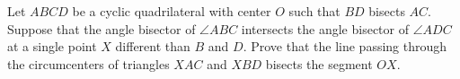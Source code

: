 Let $ABCD$ be a cyclic quadrilateral with center $O$ such that $BD$ bisects $AC.$ Suppose that the angle bisector of $\angle ABC$ intersects the angle bisector of $\angle ADC$ at a single point $X$ different than $B$ and $D.$ Prove that the line passing through the circumcenters of triangles $XAC$ and $XBD$ bisects the segment $OX.$

